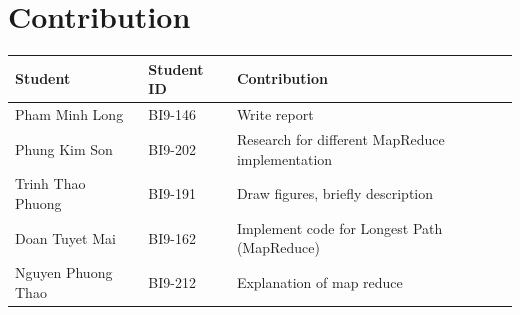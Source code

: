 \documentclass[times, 10pt]{thesisMDH}
\begin{document}
\section{Contribution}
\begin{center}
    \begin{tabular}{|l|l|l|}
        \hline
        \textbf{Student} & \textbf{Student ID} & \textbf{Contribution}\\
        \hline
        Pham Minh Long & BI9-146 & Write report\\
        \hline
        Phung Kim Son & BI9-202 & Research for different MapReduce implementation\\
        \hline
        Trinh Thao Phuong & BI9-191 & Draw figures, briefly description \\
        \hline
        Doan Tuyet Mai & BI9-162 & Implement code for Longest Path (MapReduce) \\
        \hline
        Nguyen Phuong Thao & BI9-212 & Explanation of map reduce\\
        \hline
    \end{tabular}
\end{center}
\end{document}
